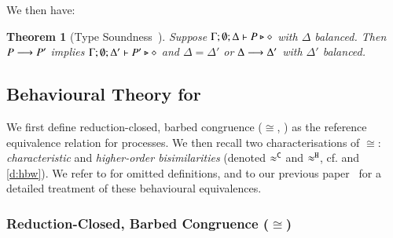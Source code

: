 \documentclass[preprint,11pt]{elsarticle}
\newtheorem{theorem}{Theorem}[section]
\begin{document}
{%



We then have:

\begin{theorem}[Type Soundness~\cite{KouzapasPY17}]\label{t:sr}\rm
%
			Suppose $\Gamma; \emptyset; \Delta \vdash P \triangleright \diamond$
			with
			$\Delta$ balanced. 
			Then $P \longrightarrow P'$ implies $\Gamma; \emptyset; \Delta'  \vdash P' \triangleright \diamond$
			and $\Delta = \Delta'$ or $\Delta \longrightarrow \Delta'$
			with $\Delta'$ balanced. 
\end{theorem}





\subsection{Behavioural Theory for \HOp}\label{sec:bt}
%

We first define reduction-closed, barbed congruence ($\cong$, ) as the
reference equivalence relation for \HOp processes.
We then recall two characterisations of $\cong$:
\emph{characteristic} and
\emph{higher-order bisimilarities}   
 (denoted $\approx^\mathtt{C}$ and $\approx^\mathtt{H}$, cf.  and \ref{d:hbw}). 
 We refer to  for omitted definitions, 
 and to our previous paper~\cite{KouzapasPY17} for a detailed treatment of these behavioural equivalences. 

\subsubsection{Reduction-Closed, Barbed Congruence ($\cong$)}
\label{subsec:rc}

}
\end{document}

